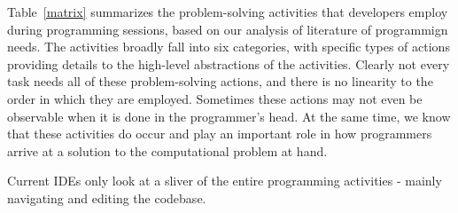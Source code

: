 \documentclass{ppig}
\begin{document}

Table~\ref{matrix} summarizes the problem-solving activities that developers employ during programming sessions, based on our analysis of literature of programmign needs. The activities broadly fall into six categories, with specific types of actions providing details to the high-level abstractions of the activities.
Clearly not every task needs all of these problem-solving actions, and there is no linearity to the order in which they are employed.
Sometimes these actions may not even be observable when it is done in the programmer's head.
At the same time, we know that these activities do occur and play an important role in how programmers arrive at a solution to the computational problem at hand.

Current IDEs only look at a sliver of the entire programming activities - mainly navigating and editing the codebase.
\end{document}
